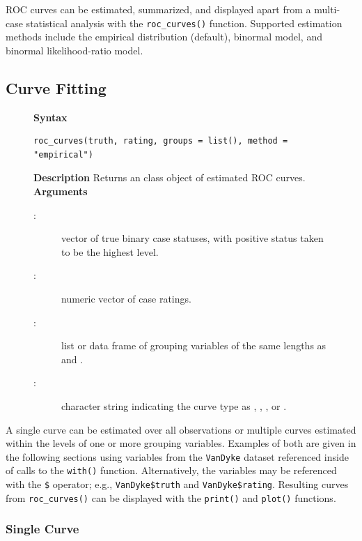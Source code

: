 \documentclass[
]{jss}
\newenvironment{Description}{\textbf{Description}\vspace{0.5em}\newline}{\vspace{0.5em}\newline}
\begin{document}
ROC curves can be estimated, summarized, and displayed apart from a
multi-case statistical analysis with the \texttt{roc\_curves()}
function. Supported estimation methods include the empirical
distribution (default), binormal model, and binormal likelihood-ratio
model.

\hypertarget{curve-fitting}{%
\subsection{Curve Fitting}\label{curve-fitting}}

\begin{figure}[h]
\begin{tcolorbox}[title=ROC Curves Function]
\textbf{Syntax}
\begin{verbatim}
roc_curves(truth, rating, groups = list(), method = "empirical")
\end{verbatim}
\begin{Description}
Returns an  class object of estimated ROC curves.
\end{Description}
\textbf{Arguments}
\begin{description}
\item[:] vector of true binary case statuses, with positive status taken to be the highest level.
\item[:] numeric vector of case ratings.
\item[:] list or data frame of grouping variables of the same lengths as  and .
\item[:] character string indicating the curve type as , , , or .
\end{description}
\end{tcolorbox}
\end{figure}

A single curve can be estimated over all observations or multiple curves
estimated within the levels of one or more grouping variables. Examples
of both are given in the following sections using variables from the
\texttt{VanDyke} dataset referenced inside of calls to the
\texttt{with()} function. Alternatively, the variables may be referenced
with the \texttt{\$} operator; e.g., \texttt{VanDyke\$truth} and
\texttt{VanDyke\$rating}. Resulting curves from \texttt{roc\_curves()}
can be displayed with the \texttt{print()} and \texttt{plot()}
functions.

\hypertarget{single-curve}{%
\subsubsection{Single Curve}\label{single-curve}}
\end{document}
